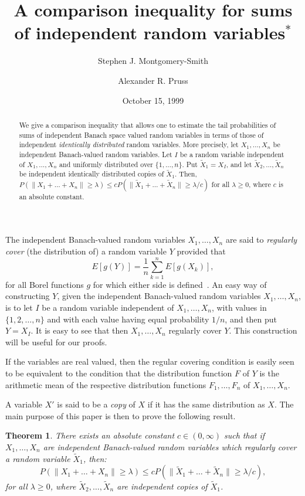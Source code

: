 \documentclass[12pt]{amsart}
\title[A comparison inequality]{A comparison inequality for sums of independent
random variables$^*$}
\author{Stephen J. Montgomery-Smith}
\author{Alexander R. Pruss}
\date{October 15, 1999}
\def\oo{\infty}
\theoremstyle{definition}
\theoremstyle{plain}
\newtheorem{thm}{Theorem}
\theoremstyle{remark}
\begin{document}
\baselineskip=16pt
\begin{abstract}
        We give a comparison inequality that allows one to estimate the
        tail probabilities of sums of independent
        Banach space valued
        random variables in
        terms of those of independent {\em identically distributed}
        random variables.
        More precisely, let $X_1,\dots,X_n$ be independent
        Banach-valued
        random variables.  Let $I$ be a random variable independent of
        $X_1,\dots,X_n$ and uniformly distributed over $\{ 1,\dots,n
        \}$.  Put $\tilde X_1=X_I$, and let $\tilde X_2,\dots,\tilde
        X_n$ be independent identically distributed copies of $\tilde
        X_1$.
         Then,
        $P(\|X_1+\dots+X_n\| \ge \lambda)\le cP(\|\tilde
        X_1+\dots+\tilde X_n\|\ge \lambda/c)$ for all
        $\lambda\ge 0$, where $c$ is an absolute constant.
\end{abstract}

\maketitle

The independent Banach-valued
random
variables $X_1,\dots,X_n$ are said
to {\em regularly cover} (the distribution of) a random variable $Y$
provided that
$$
        E[g(Y)]=\frac1n \sum_{k=1}^n E[g(X_k)],
$$
for all Borel functions $g$ for which either side is
defined~\cite{Pruss:Riemann}.  An easy way of constructing $Y$, given
the independent Banach-valued random variables $X_1,\dots,X_n$, is to let
$I$ be a random variable independent of $X_1,\dots,X_n$, with values in
$\{1,2,\dots,n\}$ and with each value having equal probability $1/n$,
and then put $Y=X_I$.  It is easy to see that then $X_1,\dots,X_n$
regularly cover $Y$.  This construction will be useful for our proofs.

If the variables are real valued, then the regular covering condition is
easily seen to be equivalent to the condition that the distribution
function $F$ of $Y$ is the arithmetic mean of the respective
distribution functions $F_1,\dots,F_n$ of $X_1,\dots,X_n$.

A variable $X'$ is said to be a {\em copy}\/ of $X$ if it has the same
distribution as $X$. The main purpose of this paper is then to prove the
following result.

\begin{thm}\label{th:main}
        There exists an absolute constant $c\in (0,\oo)$ such that if
        $X_1,\dots,X_n$ are independent Banach-valued random variables which
regularly
        cover a random variable $\tilde X_1$, then:
\begin{equation}\label{eq:the-ineq}
        P(\|X_1+\dots+X_n\|\ge\lambda) \le cP(\|\tilde X_1+\dots+\tilde
        X_n\|\ge\lambda/c),
\end{equation}
        for all $\lambda\ge 0$, where $\tilde X_2,\dots,\tilde X_n$
        are independent copies of $\tilde X_1$.
\end{thm}
\end{document}
